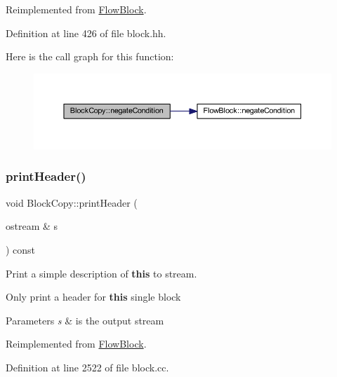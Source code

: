 Reimplemented from \mbox{\hyperlink{class_flow_block_ae0f8a479ae1548280ff0b4f45bc08dc3}{Flow\+Block}}.



Definition at line 426 of file block.\+hh.

Here is the call graph for this function\+:
\nopagebreak
\begin{figure}[H]
\begin{center}
\leavevmode
\includegraphics[width=350pt]{class_block_copy_ad31f116ca37dd1ba235f0642365cf4f4_cgraph}
\end{center}
\end{figure}
\mbox{\label{class_block_copy_aa360ee1fda40a1cb2289cb92e615fb9c}} 
\subsubsection{\texorpdfstring{printHeader()}{printHeader()}}
{\footnotesize\ttfamily void Block\+Copy\+::print\+Header (\begin{DoxyParamCaption}\item[{ostream \&}]{s }\end{DoxyParamCaption}) const\hspace{0.3cm}{\ttfamily [virtual]}}



Print a simple description of {\bfseries{this}} to stream. 

Only print a header for {\bfseries{this}} single block 
\begin{DoxyParams}{Parameters}
{\em s} & is the output stream \\
\hline
\end{DoxyParams}


Reimplemented from \mbox{\hyperlink{class_flow_block_a0d19c5b80186cf289dfbe0ce9e3ce37a}{Flow\+Block}}.



Definition at line 2522 of file block.\+cc.

